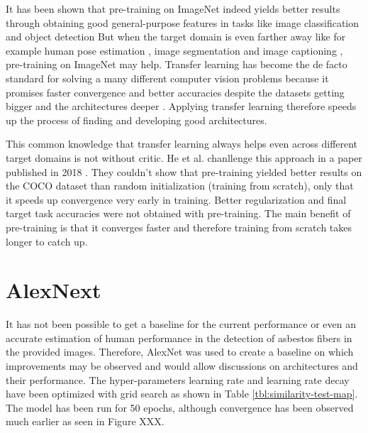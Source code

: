 It has been shown that pre-training on ImageNet indeed yields better results through obtaining good general-purpose features in tasks like image classification \cite{sharif2014cnn} and object detection \cite{girshick2014rich, sermanet2013overfeat} But when the target domain is even farther away like for example human pose estimation \cite{carreira2016human}, image segmentation \cite{dai2016instance} and image captioning \cite{donahue2015long, karpathy2015deep}, pre-training on ImageNet may help. Transfer learning has become the de facto standard for solving a many different computer vision problems because it promises faster convergence and better accuracies despite the datasets getting bigger and the architectures deeper \cite{huh2016makes}. Applying transfer learning therefore speeds up the process of finding and developing good architectures.

This common knowledge that transfer learning always helps even across different target domains is not without critic. He et al. chanllenge this approach in a paper published in 2018 \cite{he2018rethinking}. They couldn't show that pre-training yielded better results on the COCO dataset than random initialization (training from scratch), only that it speeds up convergence very early in training. Better regularization and final target task accuracies were not obtained with pre-training. The main benefit of pre-training is that it converges faster and therefore training from scratch takes longer to catch up.

\section{AlexNext}

It has not been possible to get a baseline for the current performance or even an accurate estimation of human performance in the detection of asbestos fibers in the provided images. Therefore, AlexNet was used to create a baseline on which improvements may be observed and would allow discussions on architectures and their performance. The hyper-parameters learning rate and learning rate decay have been optimized with grid search as shown in Table \ref{tbl:similarity-test-map}. The model has been run for 50 epochs, although convergence has been observed much earlier as seen in Figure XXX.

